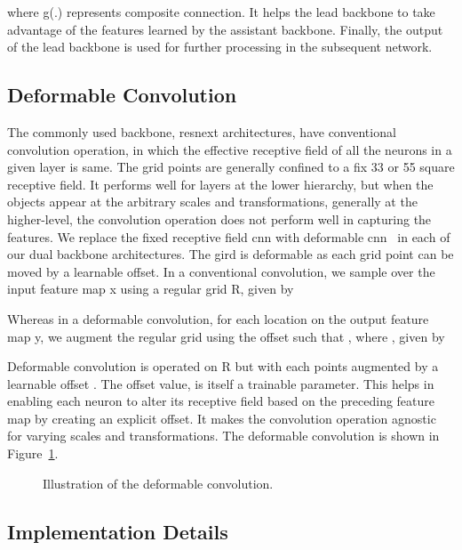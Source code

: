 \documentclass[a4paper,conference]{IEEEtran}
\begin{document}
where g(.) represents composite connection. It helps the lead backbone to take advantage of the features learned by the assistant backbone. Finally, the output of the lead backbone is used for further processing in the subsequent network. 

\subsection{Deformable Convolution}

The commonly used backbone, {\sc r}es{\sc n}e{\sc x}t architectures, have conventional convolution operation, in which the effective receptive field of all the neurons in a given layer is same. The grid points are generally confined to a fix 33 or 55 square receptive field. It performs well for layers at the lower hierarchy, but when the objects appear at the arbitrary scales and transformations, generally at the higher-level, the convolution operation does not perform well in capturing the features. We replace the fixed receptive field {\sc cnn} with deformable {\sc cnn}~\cite{dai2017deformable} in each of our dual backbone architectures. The gird is deformable as each grid point can be moved by a learnable offset. In a conventional convolution, we sample over the input feature map x using a regular grid R, given by


Whereas in a deformable convolution, for each location  on the output feature map y,  we augment the regular grid using the offset  such that , where , given by



 Deformable convolution is operated on R but with each points augmented by a learnable offset . The offset value,  is itself a trainable parameter. This helps in enabling each neuron to alter its receptive field based on the preceding feature map by creating an explicit offset. It makes the convolution operation agnostic for varying scales and transformations. The deformable convolution is shown in Figure~\ref{fig:deformable}.

\begin{figure}[ht!]
\centerline{
}
\caption{Illustration of the deformable convolution. \label{fig:deformable}}
\end{figure}

\subsection{Implementation Details}
\end{document}
